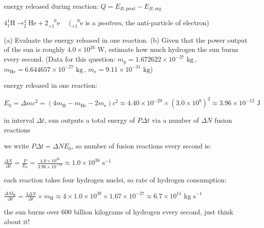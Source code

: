 energy released during reaction: $Q= E_{B,\text{prod}} - E_{B,\text{org}}$


{

\centering

$4 ^1_1\text{H} \longrightarrow ^4_2\text{He} + 2 ^{\phantom{+}0}_{+1}\text{e} \quad$ ($^{\phantom{+}0}_{+1}\text{e}$ is a \emph{positron}, the anti-particle of electron)

}

\noindent (a) Evaluate the energy released in one reaction. (b) Given that the power output of the sun is roughly $4.0\times10^{26}\text{ W}$, estimate how much hydrogen the sun burns every second. (Data for this question: $m_\text{p}=1.672622\times10^{-27}\text{ kg} \,$, $m_\text{He}=6.644657\times10^{-27}\text{ kg} \,$,  $m_\text{e}=9.11\times10^{-31}\text{ kg}$)


\sol energy released in one reaction:

{
	
	\centering

	$E_0 = \Delta mc^2 = (4m_\text{H} - m_\text{He} - 2m_\text{e}) c^2 \approx 4.40\times10^{-29} \times (3.0\times10^8)^2 \approx 3.96\times10^{-12} \text{ J}$
	
}

in interval $\Delta t$, sun outputs a total energy of $P\Delta t$ via a number of $\Delta N$ fusion reactions

we write $P\Delta t = \Delta N E_0$, so number of fusion reactions every second is:

{
	
	\centering
	
	$\frac{\Delta N}{\Delta t} = \frac{P}{E_0} = \frac{4.0\times10^{26}}{3.96\times10^{-12}} \approx 1.0\times 10^{38} \text{ s}^{-1}$
	
}

each reaction takes four hydrogen nuclei, so rate of hydrogen consumption:

{
	
	\centering
	
	$\frac{\Delta M_\text{H}}{\Delta t} = \frac{4\Delta N}{\Delta t} \times m_\text{H} \approx 4 \times 1.0\times 10^{38} \times1.67\times10^{-27} \approx 6.7\times10^{11} \text{ kg s}^{-1}$
	
}

the sun burns over 600 billion kilograms of hydrogen every second, just think about it! \eoe

